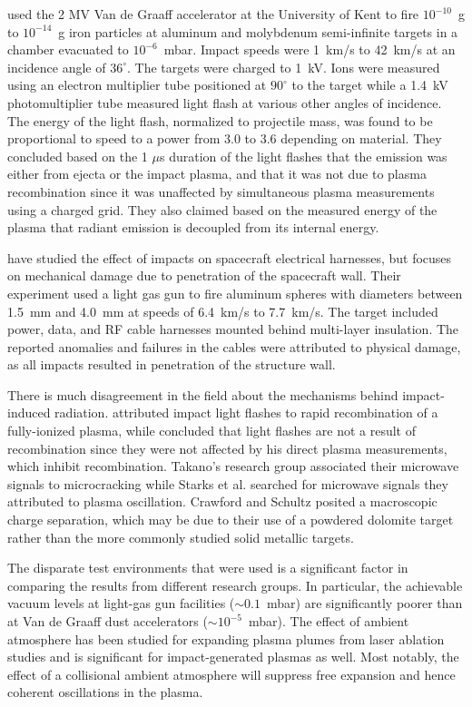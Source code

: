 \citet{Burchell1996} used the 2 MV Van de Graaff accelerator at the University of Kent to fire $10^{-10}$~g to $10^{-14}$~g iron particles at aluminum and molybdenum semi-infinite targets in a chamber evacuated to $10^{-6}$~mbar.  Impact speeds were 1~km/s to 42~km/s at an incidence angle of $36^\circ$.  The targets were charged to 1~kV.  Ions were measured using an electron multiplier tube positioned at $90^\circ$ to the target while a 1.4~kV photomultiplier tube measured light flash at various other angles of incidence.  The energy of the light flash, normalized to projectile mass, was found to be proportional to speed to a power from 3.0 to 3.6 depending on material.  They concluded based on the 1 $\mu$s duration of the light flashes that the emission was either from ejecta or the impact plasma, and that it was not due to plasma recombination since it was unaffected by simultaneous plasma measurements using a charged grid.  They also claimed based on the measured energy of the plasma that radiant emission is decoupled from its internal energy.

\citet{Putzar2008} have studied the effect of impacts on spacecraft electrical harnesses, but focuses on mechanical damage due to penetration of the spacecraft wall.  Their experiment used a light gas gun to fire aluminum spheres with diameters between 1.5~mm and 4.0~mm at speeds of 6.4~km/s to 7.7~km/s.  The target included power, data, and RF cable harnesses mounted behind multi-layer insulation.  The reported anomalies and failures in the cables were attributed to physical damage, as all impacts resulted in penetration of the structure wall.

There is much disagreement in the field about the mechanisms behind impact-induced radiation.  \citet{Starks2006} attributed impact light flashes to rapid recombination of a fully-ionized plasma, while \citet{Burchell1996} concluded that light flashes are not a result of recombination since they were not affected by his direct plasma measurements, which inhibit recombination.  Takano's research group \cite{Takano2002,Maki2004,Ohnishi2005,Ohnishi2007} associated their microwave signals to microcracking while Starks et al. searched for microwave signals they attributed to plasma oscillation.  Crawford and Schultz \cite{Crawford1993,Crawford1999} posited a macroscopic charge separation, which may be due to their use of a powdered dolomite target rather than the more commonly studied solid metallic targets.

The disparate test environments that were used is a significant factor in comparing the results from different research groups.  In particular, the achievable vacuum levels at light-gas gun facilities (${\sim}0.1$~mbar) are significantly poorer than at Van de Graaff dust accelerators (${\sim}10^{-5}$~mbar).  The effect of ambient atmosphere has been studied for expanding plasma plumes from laser ablation studies \cite{Harilal2003} and is significant for impact-generated plasmas as well.  Most notably, the effect of a collisional ambient atmosphere will suppress free expansion and hence coherent oscillations in the plasma.

